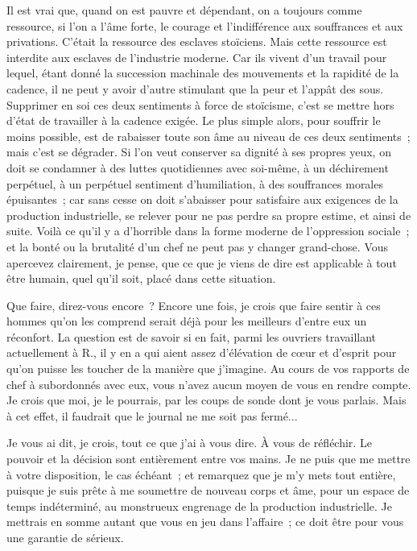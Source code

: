 \documentclass[french,twoside]{book} %
\begin{document}
Il est vrai que, quand on est pauvre et dépendant, on a toujours comme ressource, si l'on a l'âme forte, le courage et l'indifférence aux souffrances et aux privations. C'était la ressource des esclaves stoïciens. Mais cette ressource est interdite aux esclaves de l'industrie moderne. Car ils vivent d'un travail pour lequel, étant donné la succession machinale des mouvements et la rapidité de la cadence, il ne peut y avoir d'autre stimulant que la peur et l'appât des sous. Supprimer en soi ces deux sentiments à force de stoïcisme, c'est se mettre hors d'état de travailler à la cadence exigée. Le plus simple alors, pour souffrir le moins possible, est de rabaisser toute son âme au niveau de ces deux sentiments ; mais c'est se dégrader. Si l'on veut conserver sa dignité à ses propres yeux, on doit se condamner à des luttes quotidiennes avec soi-même, à un déchirement perpétuel, à un perpétuel sentiment d'humiliation, à des souffrances morales épuisantes ; car sans cesse on doit s'abaisser pour satisfaire aux exigences de la production industrielle, se relever pour ne pas perdre sa propre estime, et ainsi de suite. Voilà ce qu'il y a d'horrible dans la forme moderne de l'oppression sociale ; et la bonté ou la brutalité d'un chef ne peut pas y changer grand-chose. Vous apercevez clairement, je pense, que ce que je viens de dire est applicable à tout être humain, quel qu'il soit, placé dans cette situation.\par
Que faire, direz-vous encore ? Encore une fois, je crois que faire sentir à ces hommes qu'on les comprend serait déjà pour les meilleurs d'entre eux un réconfort. La question est de savoir si en fait, parmi les ouvriers travaillant actuellement à R., il y en a qui aient assez d'élévation de cœur et d'esprit pour qu'on puisse les toucher de la manière que j'imagine. Au cours de vos rapports de chef à subordonnés avec eux, vous n'avez aucun moyen de vous en rendre compte. Je crois que moi, je le pourrais, par les coups de sonde dont je vous parlais. Mais à cet effet, il faudrait que le journal ne me soit pas fermé...\par
Je vous ai dit, je crois, tout ce que j'ai à vous dire. À vous de réfléchir. Le pouvoir et la décision sont entièrement entre vos mains. Je ne puis que me mettre à votre disposition, le cas échéant ; et remarquez que je m'y mets tout entière, puisque je suis prête à me soumettre de nouveau corps et âme, pour un espace de temps indéterminé, au monstrueux engrenage de la production industrielle. Je mettrais en somme autant que vous en jeu dans l'affaire ; ce doit être pour vous une garantie de sérieux.\par
\end{document}
